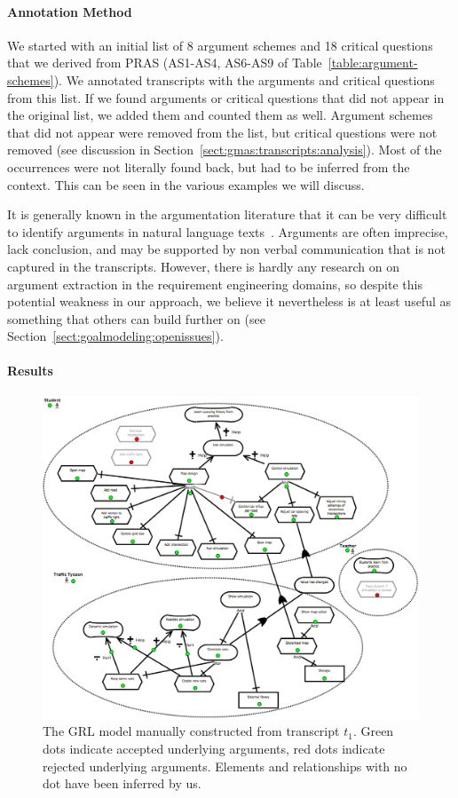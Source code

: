 \paragraph{Annotation Method} 

We started with an initial list of 8 argument schemes and 18 critical questions that we derived from PRAS (AS1-AS4, AS6-AS9 of Table~\ref{table:argument-schemes}). We annotated transcripts with the arguments and critical questions from this list. If we found arguments or critical questions that did not appear in the original list, we added them and counted them as well. Argument schemes that did not appear were removed from the list, but critical questions were not removed (see discussion in Section~\ref{sect:gmas:transcripts:analysis}). Most of the occurrences were not literally found back, but had to be inferred from the context. This can be seen in the various examples we will discuss.

It is generally known in the argumentation literature that it can be very difficult to identify arguments in natural language texts~\cite{walton-etal2004}. Arguments are often imprecise, lack conclusion, and may be supported by non verbal communication that is not captured in the transcripts. However, there is hardly any research on on argument extraction in the requirement engineering domains, so despite this potential weakness in our approach, we believe it nevertheless is at least useful as something that others can build further on (see Section~\ref{sect:goalmodeling:openissues}).

\paragraph{Results}

\begin{figure}[h]
\includegraphics[width=\textwidth]{img/transcript_grl}
\caption{The GRL model manually constructed from transcript $t_1$. Green dots indicate accepted underlying arguments, red dots indicate rejected underlying arguments. Elements and relationships with no dot have been inferred by us.}
\label{fig:transcripts:grl}
\end{figure}

